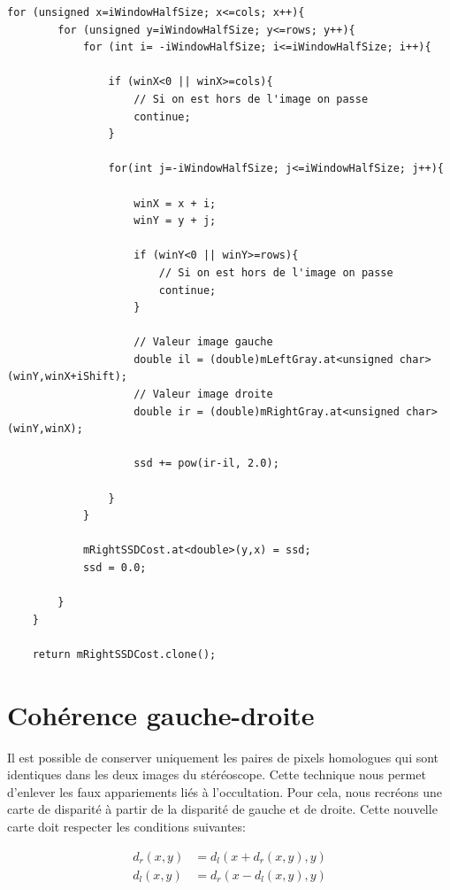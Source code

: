 \documentclass[a4paper,11pt]{article}
\begin{document}
\begin{lstlisting}[caption=Calcul de la SSD droit]
    for (unsigned x=iWindowHalfSize; x<=cols; x++){
        for (unsigned y=iWindowHalfSize; y<=rows; y++){
            for (int i= -iWindowHalfSize; i<=iWindowHalfSize; i++){

                if (winX<0 || winX>=cols){
                    // Si on est hors de l'image on passe
                    continue;
                }

                for(int j=-iWindowHalfSize; j<=iWindowHalfSize; j++){

                    winX = x + i;
                    winY = y + j;

                    if (winY<0 || winY>=rows){
                        // Si on est hors de l'image on passe
                        continue;
                    }

                    // Valeur image gauche
                    double il = (double)mLeftGray.at<unsigned char>(winY,winX+iShift);
                    // Valeur image droite
                    double ir = (double)mRightGray.at<unsigned char>(winY,winX);

                    ssd += pow(ir-il, 2.0);

                }
            }

            mRightSSDCost.at<double>(y,x) = ssd;
            ssd = 0.0;

        }
    }

    return mRightSSDCost.clone();
\end{lstlisting}

\newpage

\section{Cohérence gauche-droite}

Il est possible de conserver uniquement les paires de pixels homologues qui sont 
identiques dans les deux images du stéréoscope. Cette technique nous permet d'enlever les 
faux appariements liés à l'occultation. Pour cela, nous recréons une carte de 
disparité à partir de la disparité de gauche et de droite. Cette nouvelle carte 
doit respecter les conditions suivantes:

$$
\begin{aligned}
d_r(x,y) &= d_l(x+d_r(x,y),y) \\
d_l(x,y) &= d_r(x-d_l(x,y),y) \\
\end{aligned}
$$
\end{document}
